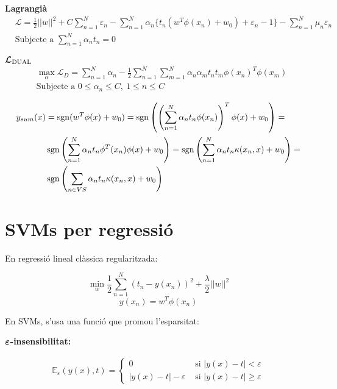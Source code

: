 \textbf{Lagrangià}
\begin{align*}
	& \mathcal{L} = \frac{1}{2} ||w||^2 + C \sum_{n=1}^N \varepsilon_n - 
	\sum_{n=1}^N \alpha_n \{ t_n (w^T \phi(x_n) + w_0) + \varepsilon_n - 1 \} -
	\sum_{n=1}^N \mu_n \varepsilon_n \\
	& \text{Subjecte a } \sum_{n=1}^N \alpha_n t_n = 0
\end{align*}

$\boldsymbol{\mathcal{L}_{\text{DUAL}}}$
\begin{align*}
	&\max_{\alpha} \mathcal{L}_D = \sum_{n=1}^N \alpha_n - \frac{1}{2}
	\sum_{n=1}^N \sum_{m=1}^N \alpha_n \alpha_m t_n t_m \phi(x_n)^T \phi(x_m)\\
	& \text{Subjecte a } 0 \le \alpha_n \le C,\ 1 \le n \le C
\end{align*}

\begin{align*}
	y_{sum}(x) &= \operatorname{sgn}(w^T \phi(x) + w_0) = 
	\operatorname{sgn}\left( \left( \sum_{n=1}^N \alpha_n t_n \phi(x_n) \right)^T 
	\phi(x) + w_0 \right) = \\
	& \operatorname{sgn} \left( \sum_{n=1}^N \alpha_n t_n \phi^T(x_n) \phi (x) + w_0 \right) = 
	\operatorname{sgn} \left( \sum_{n=1}^N \alpha_n t_n \kappa(x_n, x) + w_0 \right) = \\
	& \operatorname{sgn} \left( \sum_{n \in VS} \alpha_n t_n \kappa(x_n, x) + w_0 \right)
\end{align*}

\section{SVMs per regressió}

En regressió lineal clàssica regularitzada:

$$
\min_w \frac{1}{2} \sum_{n=1}^N (t_n - y(x_n))^2 + \frac{\lambda}{2}||w||^2
$$
$$
y(x_n) = w^T \phi(x_n)
$$

En SVMs, s'usa una funció que promou l'esparsitat:

\textbf{$\boldsymbol{\varepsilon}$-insensibilitat:}

\begin{align*}
	\mathbb{E}_\varepsilon (y(x), t) = 
	\begin{cases}
		0 & \text{ si } | y(x) - t| < \varepsilon \\
		|y(x) - t| - \varepsilon & \text{ si } |y(x) - t| \ge \varepsilon
	\end{cases}
\end{align*}


